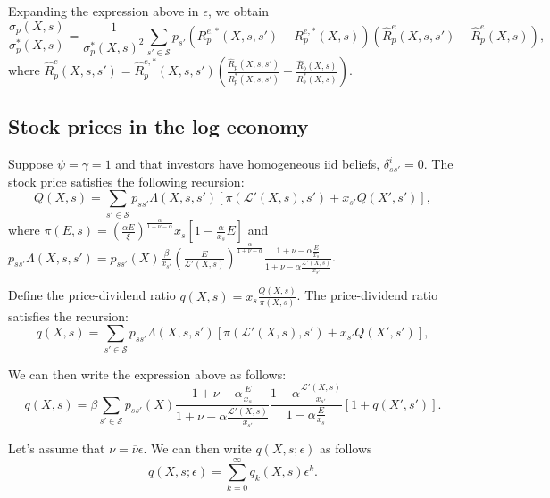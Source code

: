 Expanding the expression above in $\epsilon$, we obtain
\begin{equation}
    \frac{\hat{\sigma}_{p}(X,s)}{\sigma^*_p(X,s)} = \frac{1}{\sigma_p^*(X,s)^2}  \sum_{s'\in\mathcal{S}} p_{s'} \left( R_p^{e,*}(X,s,s') - R_p^{e,*}(X,s)\right)  \left( \hat{R}_p^{e}(X,s,s') - \hat{R}_p^{e}(X,s)\right),
\end{equation}
where $\hat{R}_p^{e}(X,s,s') = \hat{R}_p^{e,*}(X,s,s') \left( \frac{\hat{R}_p(X,s,s')}{R^*_p(X,s,s')} - \frac{\hat{R}_b(X,s)}{R_b^*(X,s)} \right) $.


\subsection{Stock prices in the log economy}

Suppose $\psi = \gamma = 1$ and that investors have homogeneous iid beliefs, $\delta_{ss'}^i = 0$. The stock price satisfies the following recursion:
\begin{equation}
    Q(X,s) = \sum_{s'\in \mathcal{S}} p_{s s'} \Lambda(X,s, s') \left[ \pi(\mathcal{L}'(X,s), s') + x_{s'} Q(X', s') \right],
\end{equation}
where $\pi(E, s) =  \left( \frac{\alpha E}{\xi} \right)^{\frac{\alpha}{1+\nu - \alpha}} x_s \left[ 1- \frac{\alpha}{x_s} E \right] $ and $p_{ss'} \Lambda (X,s,s') = p_{ss'}(X) \frac{\beta}{x_{s'}} \left( \frac{E}{\mathcal{L}'(X,s)}  \right)^{\frac{\alpha}{1+\nu - \alpha}} \frac{1+\nu - \alpha \frac{E}{x_s}}{1+\nu - \alpha \frac{\mathcal{L}'(X,s)}{x_{s'}}}$.

Define the price-dividend ratio $q(X,s) = x_s \frac{Q(X,s)}{\pi(X,s)}$. The price-dividend ratio satisfies the recursion:
\begin{equation}
    q(X,s) = \sum_{s'\in \mathcal{S}} p_{s s'} \Lambda(X,s, s') \left[ \pi(\mathcal{L}'(X,s), s') + x_{s'} Q(X', s') \right],
\end{equation}

We can then write the expression above as follows:
\begin{equation}
    q(X,s) =  \beta \sum_{s'\in \mathcal{S}} p_{s s'}(X)  \frac{1+\nu - \alpha \frac{E}{x_s}}{1+\nu - \alpha \frac{\mathcal{L}'(X,s)}{x_{s'}}} \frac{1 - \alpha \frac{\mathcal{L}'(X,s)}{x_{s'}}}{1 - \alpha \frac{E}{x_s}}\left[ 1+ q(X', s') \right].
\end{equation}

Let's assume that $\nu = \overline{\nu} \epsilon$. We can then write $q(X,s; \epsilon)$ as follows
\begin{equation}
    q(X,s;\epsilon) = \sum_{k=0}^\infty q_k(X,s) \epsilon^k. 
\end{equation}

